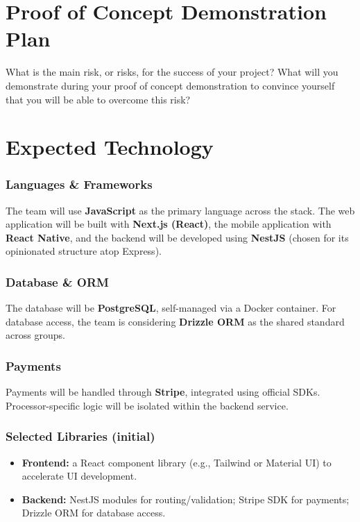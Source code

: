 \documentclass{article}
\begin{document}

\section{Proof of Concept Demonstration Plan}

What is the main risk, or risks, for the success of your project?  What will you
demonstrate during your proof of concept demonstration to convince yourself that
you will be able to overcome this risk?

\section{Expected Technology}

\subsubsection*{Languages \& Frameworks} 
The team will use \textbf{JavaScript} as the primary language across the stack. 
The web application will be built with \textbf{Next.js (React)}, the mobile application with \textbf{React Native}, 
and the backend will be developed using \textbf{NestJS} (chosen for its opinionated structure atop Express).

\subsubsection*{Database \& ORM} 
The database will be \textbf{PostgreSQL}, self-managed via a Docker container. 
For database access, the team is considering \textbf{Drizzle ORM} as the shared standard across groups.

\subsubsection*{Payments} 
Payments will be handled through \textbf{Stripe}, integrated using official SDKs. 
Processor-specific logic will be isolated within the backend service.

\subsubsection*{Selected Libraries (initial)}
\begin{itemize}
  \item \textbf{Frontend:} a React component library (e.g., Tailwind or Material UI) to accelerate UI development.
  \item \textbf{Backend:} NestJS modules for routing/validation; Stripe SDK for payments; Drizzle ORM for database access.
\end{itemize}
\end{document}
